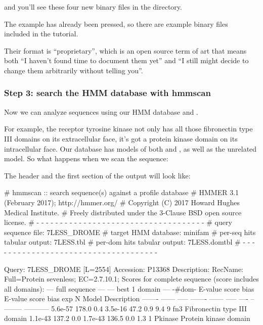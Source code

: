 and you'll see these four new binary files in the directory. 

The  example has already been pressed, so there
are example binary files\\
included in the tutorial.

Their format is ``proprietary'', which is an open source term of art
that means both ``I haven't found time to document them yet'' and ``I
still might decide to change them arbitrarily without telling you''.


\subsubsection{Step 3: search the HMM database with hmmscan}

Now we can analyze sequences using our HMM database and
. 

For example, the receptor tyrosine kinase  not only
has all those fibronectin type III domains on its extracellular face,
it's got a protein kinase domain on its intracellular face. Our
 database has models of both  and
, as well as the unrelated  model. So
what happens when we scan the  sequence:


The header and the first section of the output will look like:

\begin{samepage}
\begin{sreoutput}
# hmmscan :: search sequence(s) against a profile database
# HMMER 3.1 (February 2017); http://hmmer.org/
# Copyright (C) 2017 Howard Hughes Medical Institute.
# Freely distributed under the 3-Clause BSD open source license.
# - - - - - - - - - - - - - - - - - - - - - - - - - - - - - - - - - - - -
# query sequence file:             7LESS_DROME
# target HMM database:             minifam
# per-seq hits tabular output:     7LESS.tbl
# per-dom hits tabular output:     7LESS.domtbl
# - - - - - - - - - - - - - - - - - - - - - - - - - - - - - - - - - - - -

Query:       7LESS_DROME  [L=2554]
Accession:   P13368
Description: RecName: Full=Protein sevenless;          EC=2.7.10.1;
Scores for complete sequence (score includes all domains):
   --- full sequence ---   --- best 1 domain ---    -#dom-
    E-value  score  bias    E-value  score  bias    exp  N  Model    Description
    ------- ------ -----    ------- ------ -----   ---- --  -------- -----------
    5.6e-57  178.0   0.4    3.5e-16   47.2   0.9    9.4  9  fn3       Fibronectin type III domain
    1.1e-43  137.2   0.0    1.7e-43  136.5   0.0    1.3  1  Pkinase   Protein kinase domain
\end{sreoutput}
\end{samepage}

